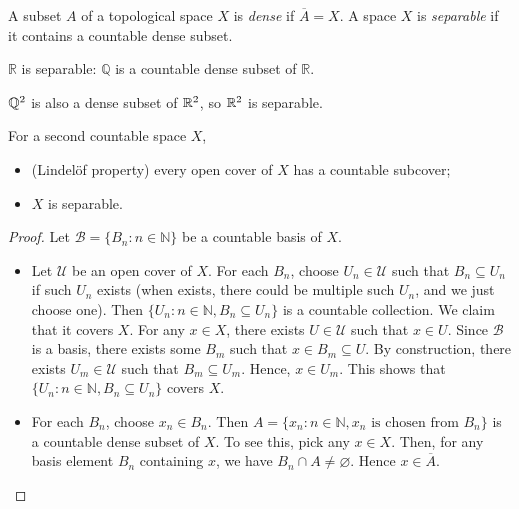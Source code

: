 \begin{definition}
    A subset $A$ of a topological space $X$ is \emph{dense} if $\overline{A}=X$. A space $X$ is \emph{separable} if it contains a countable dense subset.
\end{definition}

\begin{example}
    $\mathbb{R}$ is separable: $\mathbb{Q}$ is a countable dense subset of $\mathbb{R}$.

    $\mathbb{Q}^2$ is also a dense subset of $\mathbb{R}^2$, so $\mathbb{R}^2$ is separable.
\end{example}

\begin{theorem}
    For a second countable space $X$, 
    \begin{itemize}
        \item (Lindelöf property) every open cover of $X$ has a countable subcover;
        \item $X$ is separable.
    \end{itemize}
\end{theorem}
\begin{proof}
    Let $\mathcal{B}=\{B_n:n\in\mathbb{N}\}$ be a countable basis of $X$.
    \begin{itemize}
        \item Let $\mathcal{U}$ be an open cover of $X$. For each $B_n$, choose $U_n\in\mathcal{U}$ such that $B_n\subseteq U_n$ if such $U_n$ exists (when exists, there could be multiple such $U_n$, and we just choose one). Then $\{U_n:n\in\mathbb{N}, B_n\subseteq U_n\}$ is a countable collection. We claim that it covers $X$. For any $x\in X$, there exists $U\in\mathcal{U}$ such that $x\in U$. Since $\mathcal{B}$ is a basis, there exists some $B_m$ such that $x\in B_m\subseteq U$. By construction, there exists $U_m\in\mathcal{U}$ such that $B_m\subseteq U_m$. Hence, $x\in U_m$. This shows that $\{U_n:n\in\mathbb{N}, B_n\subseteq U_n\}$ covers $X$.
        \item For each $B_n$, choose $x_n\in B_n$. Then $A=\{x_n:n\in\mathbb{N}, x_n\text{ is chosen from }B_n\}$ is a countable dense subset of $X$. To see this, pick any $x\in X$. Then, for any basis element $B_n$ containing $x$, we have $B_n\cap A\neq\varnothing$. Hence $x\in\overline{A}$.
    \end{itemize}
\end{proof}

